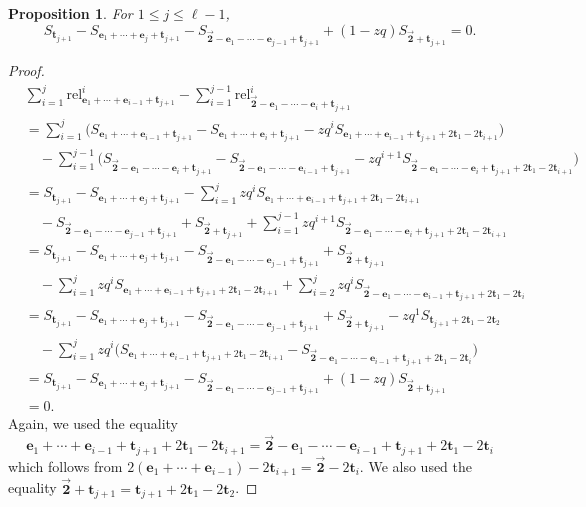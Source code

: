 \documentclass[10pt,a4paper]{amsart}
\numberwithin{equation}{section}
\newtheorem{Proposition}[Theorem]{Proposition}
\theoremstyle{definition}
\newcommand{\rel}{\text{rel}}
\newcommand{\tr}{\mathbf{t}}
\newcommand{\ee}{\mathbf{e}}
\newcommand{\two}{\vec{\mathbf{2}}}
\begin{document}
\begin{Proposition} \label{prop:comp2}
For $1 \le j \le \ell-1$,
\begin{equation*}
S_{\tr_{j+1}} -S_{\ee_1+\cdots+\ee_{j}+\tr_{j+1}}- S_{\two-\ee_1-\cdots-\ee_{j-1}+\tr_{j+1}} + (1-zq)S_{\two+\tr_{j+1}}=0.
\end{equation*}
\end{Proposition}
\begin{proof}
\begin{align*}
&\sum_{i=1}^j \rel^i_{\ee_1+\cdots+\ee_{i-1}+\tr_{j+1}} - \sum_{i=1}^{j-1}\rel^i_{\two-\ee_1-\cdots-\ee_i+\tr_{j+1}} \\
&=\sum_{i=1}^j \bigl( S_{\ee_1+\cdots+\ee_{i-1}+\tr_{j+1}} - S_{\ee_1+\cdots+\ee_{i}+\tr_{j+1}} - zq^{i} S_{\ee_1+\cdots+\ee_{i-1}+\tr_{j+1}+2\tr_1-2\tr_{i+1}}\bigr) \\
& \quad - \sum_{i=1}^{j-1}\bigl( S_{\two-\ee_1-\cdots-\ee_i+\tr_{j+1}} - S_{\two-\ee_1-\cdots-\ee_{i-1}+\tr_{j+1}} - zq^{i+1} S_{\two-\ee_1-\cdots-\ee_i+\tr_{j+1}+2\tr_1-2\tr_{i+1}}\bigr) \\
&=S_{\tr_{j+1}} -S_{\ee_1+\cdots+\ee_{j}+\tr_{j+1}} - \sum_{i=1}^j zq^{i} S_{\ee_1+\cdots+\ee_{i-1}+\tr_{j+1}+2\tr_1-2\tr_{i+1}} \\
& \quad - S_{\two-\ee_1-\cdots-\ee_{j-1}+\tr_{j+1}} + S_{\two+\tr_{j+1}} +\sum_{i=1}^{j-1}zq^{i+1} S_{\two-\ee_1-\cdots-\ee_i+\tr_{j+1}+2\tr_1-2\tr_{i+1}}
\\
&=S_{\tr_{j+1}} -S_{\ee_1+\cdots+\ee_{j}+\tr_{j+1}}- S_{\two-\ee_1-\cdots-\ee_{j-1}+\tr_{j+1}} + S_{\two+\tr_{j+1}} \\
& \quad - \sum_{i=1}^j zq^{i} S_{\ee_1+\cdots+\ee_{i-1}+\tr_{j+1}+2\tr_1-2\tr_{i+1}} +\sum_{i=2}^{j}zq^{i} S_{\two-\ee_1-\cdots-\ee_{i-1}+\tr_{j+1}+2\tr_1-2\tr_{i}} \\
&=S_{\tr_{j+1}} -S_{\ee_1+\cdots+\ee_{j}+\tr_{j+1}}- S_{\two-\ee_1-\cdots-\ee_{j-1}+\tr_{j+1}} + S_{\two+\tr_{j+1}} - zq^{1} S_{\tr_{j+1}+2\tr_1-2\tr_{2}} \\
& \quad - \sum_{i=1}^j zq^{i} \bigl( S_{\ee_1+\cdots+\ee_{i-1}+\tr_{j+1}+2\tr_1-2\tr_{i+1}} - S_{\two-\ee_1-\cdots-\ee_{i-1}+\tr_{j+1}+2\tr_1-2\tr_{i}}\bigr) \\
&=S_{\tr_{j+1}} -S_{\ee_1+\cdots+\ee_{j}+\tr_{j+1}}- S_{\two-\ee_1-\cdots-\ee_{j-1}+\tr_{j+1}} + (1-zq)S_{\two+\tr_{j+1}} \\
&=0.
\end{align*}
Again, we used the equality
\begin{equation*}
\ee_1+\cdots+\ee_{i-1}+\tr_{j+1}+2\tr_1-2\tr_{i+1}=
\two-\ee_1-\cdots-\ee_{i-1}+\tr_{j+1}+2\tr_1-2\tr_{i}
\end{equation*}
which follows from $2(\ee_1+\cdots+\ee_{i-1})-2\tr_{i+1} =\two-2\tr_{i}.$ We also used the equality $\two+\tr_{j+1} ={\tr_{j+1}+2\tr_1-2\tr_{2}}$.
\end{proof}
\end{document}
